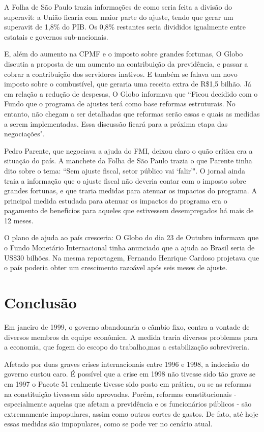 \documentclass{article}
\begin{document}
A Folha de São Paulo trazia informações de como seria feita a divisão do superavit: a União ficaria com maior parte do ajuste, tendo que gerar um superavit de 1,8\% do PIB. Os 0,8\% restantes seria divididos igualmente entre estatais e governos sub-nacionais. 

E, além do aumento na CPMF e o imposto sobre grandes fortunas, O Globo discutia a proposta de um aumento na contribuição da previdência, e passar a cobrar a contribuição dos servidores inativos. E também se falava um novo imposto sobre o combustível, que geraria uma receita extra de R\$1,5 bilhão. Já em relação a redução de despesas, O Globo informava que ``Ficou decidido com o Fundo que o programa de ajustes terá como base reformas estruturais. No entanto, não chegam a ser detalhadas que reformas serão essas e quais as medidas a serem implementadas. Essa discussão ficará para a próxima etapa das negociações". 

Pedro Parente, que negociava a ajuda do FMI, deixou claro o quão crítica era a situação do país. A manchete da Folha de São Paulo trazia o que Parente tinha dito sobre o tema: ``Sem ajuste fiscal, setor público vai `falir'". O jornal ainda traia a informação que o ajuste fiscal não deveria contar com o imposto sobre grandes fortunas, e que traria medidas para atenuar os impactos do programa. A principal medida estudada para atenuar os impactos do programa era o pagamento de benefícios para aqueles que estivessem desempregados há mais de 12 meses.     

O plano de ajuda ao país cresceria: O Globo do dia 23 de Outubro informava que o Fundo Monetário Internacional tinha anunciado que a ajuda ao Brasil seria de US\$30 bilhões. Na mesma reportagem, Fernando Henrique Cardoso projetava que o país poderia obter um crescimento razoável após seis meses de ajuste.    
 
\section{Conclusão}

Em janeiro de 1999, o governo abandonaria o câmbio fixo, contra a vontade de diversos membros da equipe econômica. A medida traria diversos problemas para a economia, que fogem do escopo do trabalho,mas a estabilização sobreviveria.

Afetado por duas graves crises internacionais entre 1996 e 1998, a indecisão do governo custou caro. É possível que a crise em 1998 não tivesse sido tão grave se em 1997 o Pacote 51 realmente tivesse sido posto em prática, ou se as reformas na constituição tivessem sido aprovadas. Porém, reformas constitucionais - especialmente aquelas que afetam a previdência e os funcionários públicos - são extremamente impopulares, assim como outros cortes de gastos. De fato, até hoje essas medidas são impopulares, como se pode ver no cenário atual.
\end{document}
